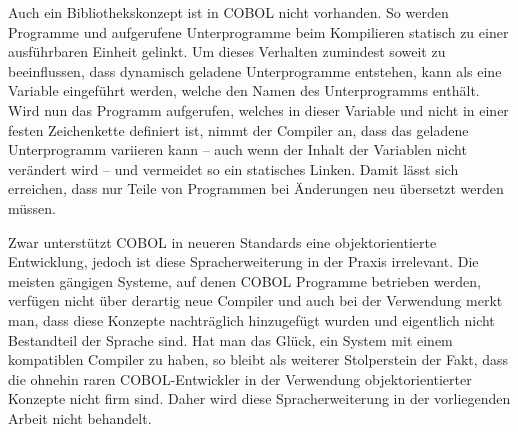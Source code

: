 Auch ein Bibliothekskonzept ist in COBOL nicht vorhanden. So werden Programme und aufgerufene Unterprogramme beim Kompilieren statisch zu einer ausführbaren Einheit gelinkt. Um dieses Verhalten zumindest soweit zu beeinflussen, dass dynamisch geladene Unterprogramme entstehen, kann als  eine Variable eingeführt werden, welche den Namen des Unterprogramms enthält. Wird nun das Programm aufgerufen, welches in dieser Variable und nicht in einer festen Zeichenkette definiert ist, nimmt der Compiler an, dass das geladene Unterprogramm variieren kann -- auch wenn der Inhalt der Variablen nicht verändert wird -- und vermeidet so ein statisches Linken. Damit lässt sich erreichen, dass nur Teile von Programmen bei Änderungen neu übersetzt werden müssen.

Zwar unterstützt COBOL in neueren Standards eine objektorientierte Entwicklung, jedoch ist diese Spracherweiterung in der Praxis irrelevant. Die meisten gängigen Systeme, auf denen COBOL Programme betrieben werden, verfügen nicht über derartig neue Compiler und auch bei der Verwendung merkt man, dass diese Konzepte nachträglich hinzugefügt wurden und eigentlich nicht Bestandteil der Sprache sind. Hat man das Glück, ein System mit einem kompatiblen Compiler zu haben, so bleibt als weiterer Stolperstein der Fakt, dass die ohnehin raren COBOL-Entwickler in der Verwendung objektorientierter Konzepte nicht firm sind. Daher wird diese Spracherweiterung in der vorliegenden Arbeit nicht behandelt. 